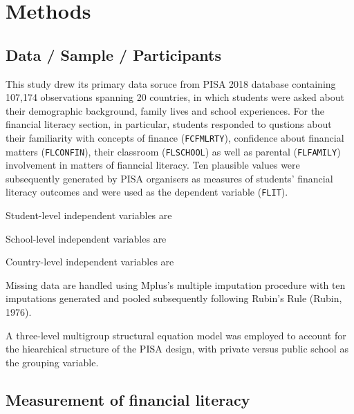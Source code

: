 \documentclass[a4paper,11pt,UKenglish,twoside,openright]{report}\usepackage[]{graphicx}\usepackage[]{color}
\begin{document}
\newpage



\newpage



\newpage



\newpage




\chapter{Methods}
\label{chp:3}

\section{Data / Sample / Participants}

This study drew its primary data soruce from PISA 2018 database \parencite{FLdata} containing 107,174 observations spanning 20 countries, in which students were asked about their demographic background, family lives and school experiences. For the financial literacy section, in particular, students responded to qustions about their familiarity with concepts of finance (\texttt{FCFMLRTY}), confidence about financial matters (\texttt{FLCONFIN}), their classroom (\texttt{FLSCHOOL}) as well as parental (\texttt{FLFAMILY}) involvement in matters of fianncial literacy. Ten plausible values were subsequently generated by PISA organisers as measures of students' financial literacy outcomes and were used as the dependent variable (\texttt{FLIT}).

Student-level independent variables are

School-level independent variables are

Country-level independent variables are

Missing data are handled using Mplus's multiple imputation procedure with ten imputations generated and pooled subsequently following Rubin's Rule (Rubin, 1976).

A three-level multigroup structural equation model was employed to account for the hiearchical structure of the PISA design, with private versus public school as the grouping variable.

\section{Measurement of financial literacy}
\end{document}

